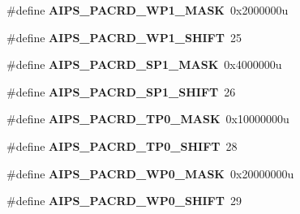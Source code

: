 \begin{DoxyCompactItemize}
\item 
\hypertarget{group___a_i_p_s___register___masks_gaf7b7df71ca00c77a7bc509549669454c}{}\#define {\bfseries A\+I\+P\+S\+\_\+\+P\+A\+C\+R\+D\+\_\+\+W\+P1\+\_\+\+M\+A\+S\+K}~0x2000000u\label{group___a_i_p_s___register___masks_gaf7b7df71ca00c77a7bc509549669454c}

\item 
\hypertarget{group___a_i_p_s___register___masks_ga644673f7f2e0212bd11a3f1a6b85884a}{}\#define {\bfseries A\+I\+P\+S\+\_\+\+P\+A\+C\+R\+D\+\_\+\+W\+P1\+\_\+\+S\+H\+I\+F\+T}~25\label{group___a_i_p_s___register___masks_ga644673f7f2e0212bd11a3f1a6b85884a}

\item 
\hypertarget{group___a_i_p_s___register___masks_ga241bd7210bde69f69f42d0b09b255044}{}\#define {\bfseries A\+I\+P\+S\+\_\+\+P\+A\+C\+R\+D\+\_\+\+S\+P1\+\_\+\+M\+A\+S\+K}~0x4000000u\label{group___a_i_p_s___register___masks_ga241bd7210bde69f69f42d0b09b255044}

\item 
\hypertarget{group___a_i_p_s___register___masks_ga2016362f517305d3780b3db76654c9e2}{}\#define {\bfseries A\+I\+P\+S\+\_\+\+P\+A\+C\+R\+D\+\_\+\+S\+P1\+\_\+\+S\+H\+I\+F\+T}~26\label{group___a_i_p_s___register___masks_ga2016362f517305d3780b3db76654c9e2}

\item 
\hypertarget{group___a_i_p_s___register___masks_gab6c35b9973f892499844b50d600f19e2}{}\#define {\bfseries A\+I\+P\+S\+\_\+\+P\+A\+C\+R\+D\+\_\+\+T\+P0\+\_\+\+M\+A\+S\+K}~0x10000000u\label{group___a_i_p_s___register___masks_gab6c35b9973f892499844b50d600f19e2}

\item 
\hypertarget{group___a_i_p_s___register___masks_ga393a80798d513d45177147291c0d3da6}{}\#define {\bfseries A\+I\+P\+S\+\_\+\+P\+A\+C\+R\+D\+\_\+\+T\+P0\+\_\+\+S\+H\+I\+F\+T}~28\label{group___a_i_p_s___register___masks_ga393a80798d513d45177147291c0d3da6}

\item 
\hypertarget{group___a_i_p_s___register___masks_ga71e04e5cf8734bccacc3a6611df85704}{}\#define {\bfseries A\+I\+P\+S\+\_\+\+P\+A\+C\+R\+D\+\_\+\+W\+P0\+\_\+\+M\+A\+S\+K}~0x20000000u\label{group___a_i_p_s___register___masks_ga71e04e5cf8734bccacc3a6611df85704}

\item 
\hypertarget{group___a_i_p_s___register___masks_ga673fcdf4f6746f32014d13feb92a0944}{}\#define {\bfseries A\+I\+P\+S\+\_\+\+P\+A\+C\+R\+D\+\_\+\+W\+P0\+\_\+\+S\+H\+I\+F\+T}~29\label{group___a_i_p_s___register___masks_ga673fcdf4f6746f32014d13feb92a0944}


\end{DoxyCompactItemize}
